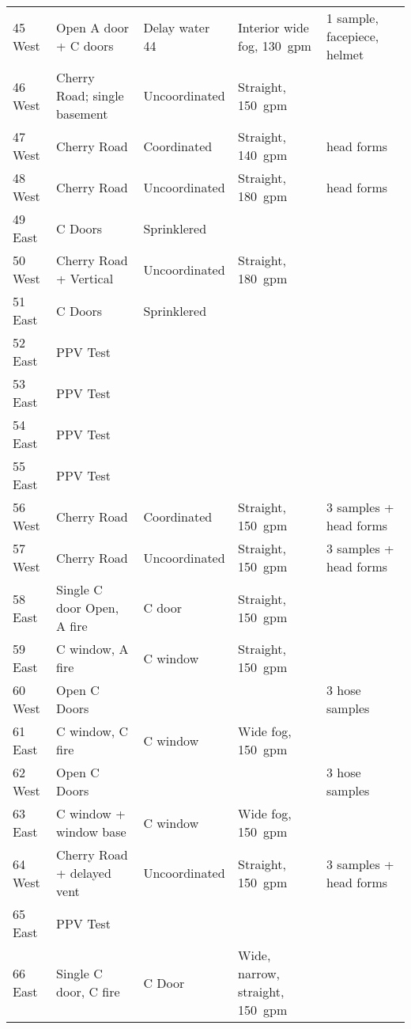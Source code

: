 \documentclass{article}
\begin{document}
\begin{sidewaystable}[htbp]
\begin{tabular}{lllll}
45 West         &  Open A door + C doors        & Delay water 44   &  Interior wide fog, 130~gpm         & 1 sample, facepiece, helmet \\
46 West         &  Cherry Road; single basement & Uncoordinated    &  Straight, 150~gpm					 & \\
47 West         &  Cherry Road					& Coordinated      &  Straight, 140~gpm					 & head forms \\
48 West         &  Cherry Road					& Uncoordinated    &  Straight, 180~gpm                  & head forms \\
49 East         &  C Doors                      & Sprinklered      & & \\
50 West         &  Cherry Road + Vertical		& Uncoordinated    &  Straight, 180~gpm                  & \\
51 East         &  C Doors                      & Sprinklered      & & \\
52 East			&  PPV Test 					& & &			\\
53 East			&  PPV Test 					& & &			\\
54 East			&  PPV Test 					& & &			\\
55 East			&  PPV Test 					& & &			\\
56 West			&  Cherry Road					& Coordinated	   &  Straight, 150~gpm					 & 3 samples + head forms \\ 
57 West			&  Cherry Road					& Uncoordinated	   &  Straight, 150~gpm					 & 3 samples + head forms \\
58 East			&  Single C door Open, A fire 	& C door    	   &  Straight, 150~gpm                  & \\
59 East         &  C window, A fire				& C window  	   &  Straight, 150~gpm					 & \\
60 West			&  Open C Doors 				& 				   &									 & 3 hose samples \\
61 East         &  C window, C fire             & C window         &  Wide fog, 150~gpm                  & \\
62 West			&  Open C Doors 				& 				   &									 & 3 hose samples \\
63 East         &  C window + window base       & C window         &  Wide fog, 150~gpm 			     & \\
64 West         &  Cherry Road + delayed vent   & Uncoordinated    &  Straight, 150~gpm					 & 3 samples + head forms \\
65 East			&  PPV Test 					& & & 			\\
66 East         &  Single C door, C fire		& C Door 		   &  Wide, narrow, straight, 150~gpm	 & \\

\bottomrule[1.25pt]
\end{tabular}
\end{sidewaystable}
\end{document}
